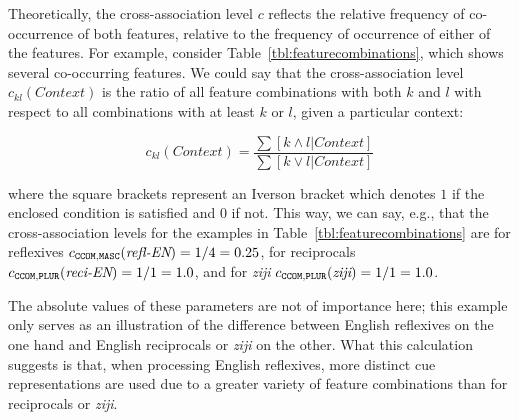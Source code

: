 \documentclass{cambridge7A}\usepackage[]{graphicx}\usepackage[]{color}
\newcommand{\actrcue}[1]{\texttt{\uppercase{#1}}}
\begin{document}
Theoretically, the   cross-association level $c$ reflects the
relative frequency of co-occurrence of both features, relative to the frequency of occurrence of either of the features. For example, consider 
Table~\ref{tbl:featurecombinations}, which shows several co-occurring features. 
We could say that the cross-association level $c_{kl}(Context)$ is the ratio of all feature combinations with both $k$ and $l$ with respect to all combinations with at least $k$ or $l$, given a particular context:

\begin{equation}
	\label{eq:cmetric}
	c_{kl}(Context) = \frac{\sum{[k \land l | Context]}}{\sum{[k \lor l | Context]}} 
\end{equation}

\noindent
where the square brackets represent an Iverson bracket which denotes $1$ if the enclosed condition is satisfied and $0$ if not.
This way, we can say, e.g., that the cross-association levels for the examples in Table~\ref{tbl:featurecombinations} are for reflexives $c_{\actrcue{ccom},\actrcue{masc}}(\textit{refl-EN}) = 1/4 = 0.25$, for reciprocals $c_{\actrcue{ccom},\actrcue{plur}}(\textit{reci-EN}) = 1/1 = 1.0$, and for \textit{ziji} $c_{\actrcue{ccom},\actrcue{plur}}(\textit{ziji}) = 1/1 = 1.0$.

The absolute values of these parameters are not of importance here; this example only serves as an illustration of the difference between English reflexives on the one hand and English reciprocals or \textit{ziji} on the other.
What this calculation suggests is that, when processing English reflexives, more distinct cue representations are used due to a greater variety of feature combinations than for reciprocals or \textit{ziji}.
\end{document}
